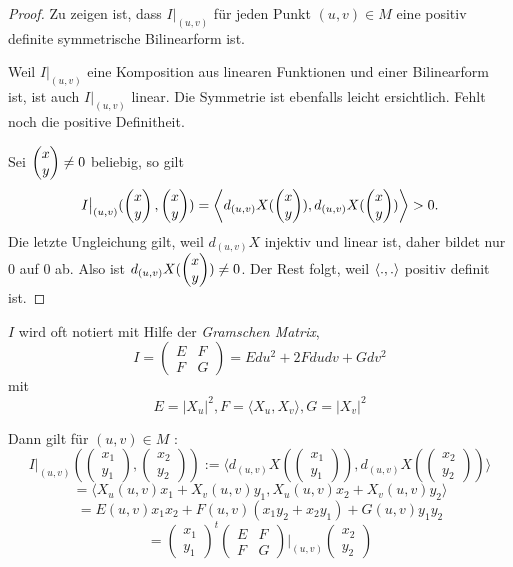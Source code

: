 \begin{proof}
	Zu zeigen ist, dass $I\big| _{(u,v)}$ für jeden Punkt $(u,v)\in M$ eine positiv definite symmetrische Bilinearform ist. 
	
	Weil $ I\big| _{(u,v)} $ eine Komposition aus linearen Funktionen und einer Bilinearform ist, ist auch $I\big| _{(u,v)}$ linear. Die Symmetrie ist ebenfalls leicht ersichtlich. Fehlt noch die positive Definitheit.
	
	Sei $\begin{pmatrix} x\\y \end{pmatrix} \neq 0$ beliebig, so gilt
		\[ I\big| _{(u,v)}(\begin{pmatrix} x\\y \end{pmatrix},\begin{pmatrix} x\\y \end{pmatrix})
			= \left \langle d_{(u,v)}X(\begin{pmatrix} x\\y \end{pmatrix}),d_{(u,v)}X(\begin{pmatrix} x\\y \end{pmatrix}) \right\rangle> 0. \]
	Die letzte Ungleichung gilt, weil $d_{(u,v)}X$ injektiv und linear ist, daher bildet nur $0$ auf $0$ ab. Also ist $d_{(u,v)}X(\begin{pmatrix} x\\y \end{pmatrix})\neq 0$. Der Rest folgt, weil $\left \langle .,. \right\rangle$ positiv definit ist.
\end{proof}

\begin{remark}
	
	$I$ wird oft notiert mit Hilfe der \emph{Gramschen Matrix}, \[ I = \begin{pmatrix}
	E & F\\
	F & G
	\end{pmatrix} = E du^2 + 2Fdudv + Gdv^2 \] mit
	\[ E=|X_u|^2, F = \langle X_u,X_v \rangle, G = |X_v|^2  \]
	


Dann gilt für $ (u,v) \in M$ : \[ I \big|_{(u,v)}(\begin{pmatrix}
x_1 \\
y_1
\end{pmatrix},\begin{pmatrix}
x_2 \\
y_2
\end{pmatrix}) := \langle d_{(u,v)}X(\begin{pmatrix}
x_1 \\
y_1
\end{pmatrix}),  d_{(u,v)}X(\begin{pmatrix}
x_2 \\
y_2
\end{pmatrix})  \rangle \] \[= \langle X_u(u,v)x_1 + X_v(u,v)y_1, X_u(u,v)x_2 + X_v(u,v)y_2 \rangle \]
\[ = E(u,v)x_1x_2 + F(u,v)(x_1y_2 + x_2y_1) + G(u,v)y_1y_2 \]
\[ = \begin{pmatrix}
x_1 \\
y_1
\end{pmatrix}^t \begin{pmatrix}
E & F \\ 
F & G
\end{pmatrix}\Bigg|_{(u,v)} \begin{pmatrix}
x_2\\
y_2
\end{pmatrix} \]

\end{remark}

